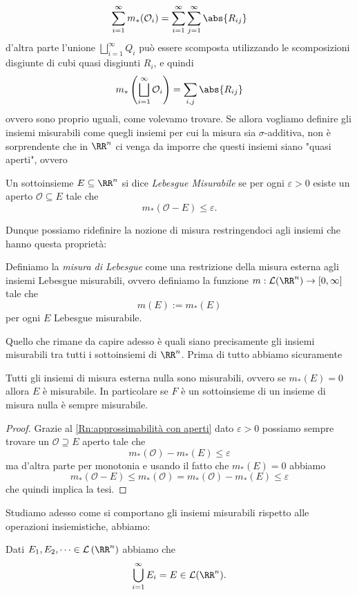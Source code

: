 \documentclass[11pt]{scrartcl}
\begin{document}
	$$\sum_{i=1}^{\infty}m_*(\mathcal{O}_i)=\sum_{i=1}^{\infty}\sum_{j=1}^{\infty}\abs{R_{ij}}$$
	d'altra parte l'unione $\bigsqcup_{i=1}^\infty Q_i$ può essere scomposta utilizzando le scomposizioni disgiunte di cubi quasi disgiunti $R_i$, e quindi
	$$m_*\left(\bigsqcup_{i=1}^\infty \mathcal{O}_i\right)=\sum_{i,j}\abs{R_{ij}}$$
	ovvero sono proprio uguali, come volevamo trovare. Se allora vogliamo definire gli insiemi misurabili come quegli insiemi per cui la misura sia $\sigma$-additiva, non è sorprendente che in $\RR^n$ ci venga da imporre che questi insiemi siano "quasi aperti", ovvero 
	\begin{definition}
		Un sottoinsieme $E\subseteq \RR^n$ si dice \textit{Lebesgue Misurabile} se per ogni $\varepsilon>0$ esiste un aperto $\mathcal{O}\subseteq E$ tale che
		$$m_*(\mathcal{O}-E)\le \varepsilon.$$
	\end{definition}
	Dunque possiamo ridefinire la nozione di misura restringendoci agli insiemi che hanno questa proprietà:
	\begin{definition}
		Definiamo la \textit{misura di Lebesgue} come una restrizione della misura esterna agli insiemi Lebesgue misurabili, ovvero definiamo la funzione $m:\mathcal{L}(\RR^n)\to [0,\infty]$ tale che
		$$m(E):=m_*(E)$$
		per ogni $E$ Lebesgue misurabile. 
	\end{definition}
	Quello che rimane da capire adesso è quali siano precisamente gli insiemi misurabili tra tutti i sottoinsiemi di $\RR^n$. Prima di tutto abbiamo sicuramente
	\begin{proposition}
		Tutti gli insiemi di misura esterna nulla sono misurabili, ovvero se $m_*(E)=0$ allora $E$ è misurabile. In particolare se $F$ è un sottoinsieme di un insieme di misura nulla è sempre misurabile.
	\end{proposition}
	\begin{proof}
		Grazie al \ref{Rn:approssimabilità con aperti} dato $\varepsilon>0$ possiamo sempre trovare un $\mathcal{O}\supseteq E$ aperto tale che
		$$m_*(\mathcal{O})-m_*(E)\le \varepsilon$$
		ma d'altra parte per monotonia e usando il fatto che $m_*(E)=0$ abbiamo
		$$m_*(\mathcal{O}-E)\le m_*(\mathcal{O})=m_*(\mathcal{O})-m_*(E)\le \varepsilon$$
		che quindi implica la tesi.
	\end{proof}
	Studiamo adesso come si comportano gli insiemi misurabili rispetto alle operazioni insiemistiche, abbiamo:
	\begin{proposition}
		Dati $E_1,E_2,\dots \in \mathcal{L}\left(\RR^n\right)$ abbiamo che
		$$\bigcup_{i=1}^\infty E_i=E \in \mathcal{L}(\RR^n).$$
	\end{proposition}  
\end{document}

